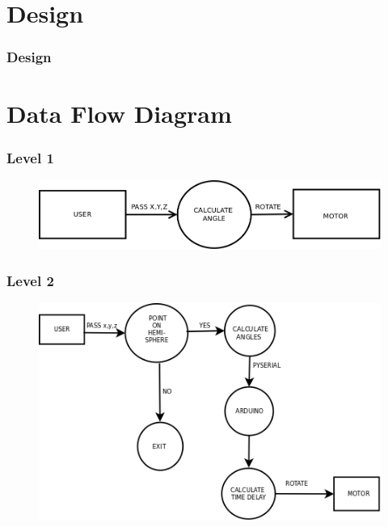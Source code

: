 \documentclass{beamer}
\begin{document}
\section{Design}
\begin{frame}
\frametitle{Design}
\end{frame}

\section{Data Flow Diagram}

\begin{frame}
\frametitle{Level 1}
 \begin{figure}
 \includegraphics[height=0.1\linewidth]{level_1.png}
  \end{figure}

\end{frame}



\begin{frame}[shrink=50]
\frametitle{Level 2}
    \begin{figure}
    \hfill\includegraphics[height=0.5\linewidth]{level_2.png}\hspace*{\fill}
    \end{figure}
    \end{frame}
    


\end{document}
